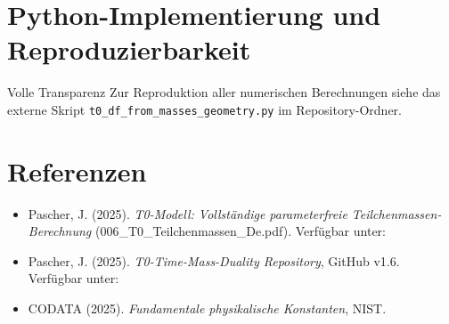 	\section{Python-Implementierung und Reproduzierbarkeit}
	\label{sec:python_implementierung}
	
	\begin{important}{Volle Transparenz}{}
		Zur Reproduktion aller numerischen Berechnungen siehe das externe Skript \texttt{t0\_df\_from\_masses\_geometry.py} im Repository-Ordner.
	\end{important}
	
	\section{Referenzen}
	\label{sec:referenzen}
	
	\begin{itemize}
		\item Pascher, J. (2025). \emph{T0-Modell: Vollständige parameterfreie Teilchenmassen-Berechnung} (006\_T0\_Teilchenmassen\_De.pdf). Verfügbar unter:\\ 
		
		\item Pascher, J. (2025). \emph{T0-Time-Mass-Duality Repository}, GitHub v1.6. Verfügbar unter: 
		
		\item CODATA (2025). \emph{Fundamentale physikalische Konstanten}, NIST.
	\end{itemize}
	